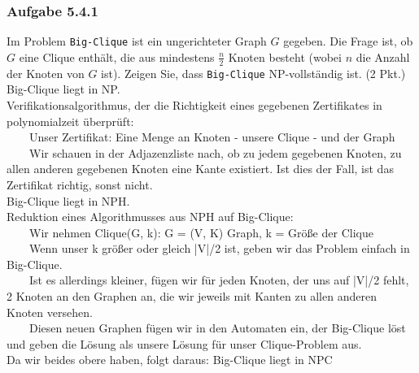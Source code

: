 \documentclass{article}
\begin{document}
\subsubsection*{Aufgabe 5.4.1}
\label{sssec:5.4.1}
Im Problem \texttt{Big-Clique} ist ein ungerichteter Graph $G$ gegeben.
Die Frage ist, ob $G$ eine Clique enthält, die aus mindestens $\frac{n}{2}$ Knoten besteht (wobei $n$ die Anzahl der Knoten von $G$ ist).
Zeigen Sie, dass \texttt{Big-Clique} NP-vollständig ist. (2 Pkt.)
\vspace{1cm}\-\\
Big-Clique liegt in NP.\\
Verifikationsalgorithmus, der die Richtigkeit eines gegebenen Zertifikates in polynomialzeit überprüft:\\
\-~~~~Unser Zertifikat: Eine Menge an Knoten - unsere Clique - und der Graph\\
\-~~~~Wir schauen in der Adjazenzliste nach, ob zu jedem gegebenen Knoten, zu allen anderen gegebenen Knoten eine Kante existiert.
	Ist dies der Fall, ist das Zertifikat richtig, sonst nicht.\\
Big-Clique liegt in NPH.\\
Reduktion eines Algorithmusses aus NPH auf Big-Clique:\\
\-~~~~Wir nehmen Clique(G, k): G = (V, K) Graph, k = Größe der Clique\\
\-~~~~Wenn unser k größer oder gleich |V|/2 ist, geben wir das Problem einfach in Big-Clique.\\
\-~~~~Ist es allerdings kleiner, fügen wir für jeden Knoten, der uns auf |V|/2 fehlt, 2 Knoten an den Graphen an, die wir jeweils mit Kanten zu allen anderen Knoten versehen.\\
\-~~~~Diesen neuen Graphen fügen wir in den Automaten ein, der Big-Clique löst und geben die Lösung als unsere Lösung für unser Clique-Problem aus.\\
Da wir beides obere haben, folgt daraus: Big-Clique liegt in NPC


\end{document}
